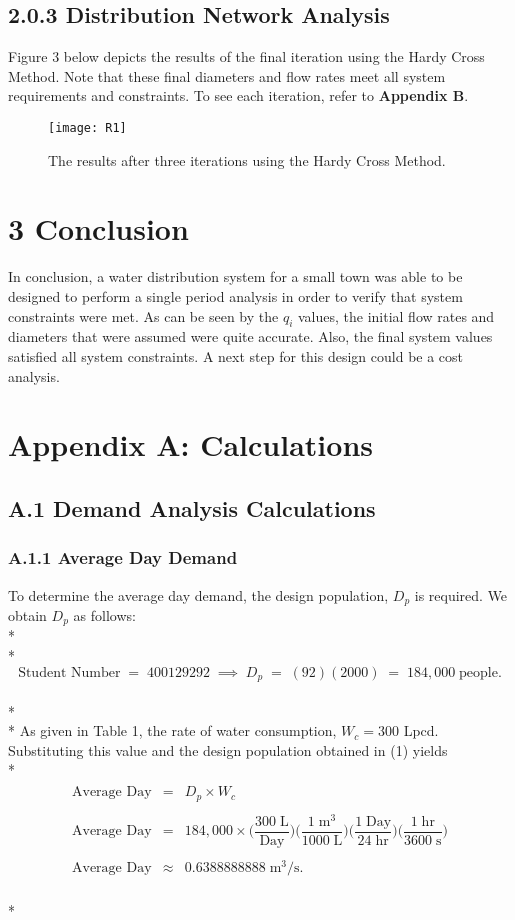 \documentclass[]{article}
\begin{document}
\subsection{2.0.3 Distribution Network Analysis} 
Figure 3 below depicts the results of the final iteration using the Hardy Cross Method. Note that these final diameters and flow rates meet all system requirements and constraints. To see each iteration, refer to \textbf{Appendix B}.
		\begin{figure}[H]
	\centering
	\texttt{[image: R1]}
	\caption[Hardy Cross Method: Results]{The results after three iterations using the Hardy Cross Method.}
\end{figure}
\section{3 Conclusion}
In conclusion, a water distribution system for a small town was able to be designed to perform a single period analysis in order to verify that system constraints were met. As can be seen by the $q_i$ values, the initial flow rates and diameters that were assumed were quite accurate. Also, the final system values satisfied all system constraints. A next step for this design could be a cost analysis.
\newpage
\section{Appendix A: Calculations}
\subsection{A.1 Demand Analysis Calculations}
\subsubsection{A.1.1 Average Day Demand}
To determine the average day demand, the design population, $D_p$ is required. We obtain $D_p$ as follows: \\* \\* 
\begin{equation}
\text{Student Number} \; = \; 400129292 \; \implies \; D_p \; = \; (92)(2000) \; = \; 184,000 \; \text{people}.
\end{equation} \\* \\* 
As given in Table 1, the rate of water consumption, $W_c = 300$ Lpcd. Substituting this value and the design population obtained in (1) yields \\*
\begin{align}
\begin{array}{rcl}
\text{Average Day} &=& D_p \times W_c \\ \\  
\text{Average Day} &=& 184,000 \times \Bigg( \dfrac{300 \; \text{L}}{\text{Day}}\Bigg) \Bigg(\dfrac{1 \; \text{m}^3}{1000 \; \text{L}}\Bigg) \Bigg(\dfrac{1\; \text{Day}}{24 \; \text{hr}}\Bigg) \Bigg(\dfrac{1 \; \text{hr}}{3600 \; \text{s}}\Bigg) \\ \\
\text{Average Day} &\approx& 0.6388888888 \; \text{m}^3/\text{s}. 
\end{array}
\end{align} \\*
\end{document}

